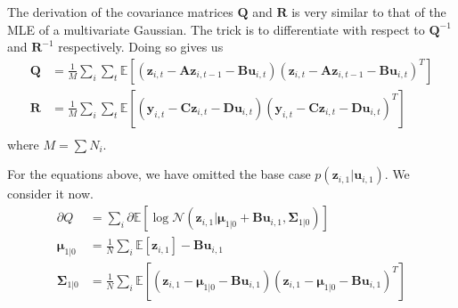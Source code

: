 \documentclass[a4paper,11pt]{article}
\begin{document}
The derivation of the covariance matrices $\mathbf{Q}$ and $\mathbf{R}$ is very similar to that of
the MLE of a multivariate Gaussian. The trick is to differentiate with respect to
$\mathbf{Q}^{-1}$ and $\mathbf{R}^{-1}$ respectively. Doing so gives us
\begin{align*}
  \mathbf{Q} &= \frac{1}{M}\sum\limits_i\sum\limits_t
  \mathbb{E}\left[
    \left(\mathbf{z}_{i,t} - \mathbf{Az}_{i,t-1}  - \mathbf{Bu}_{i,t}\right)
    \left(\mathbf{z}_{i,t} - \mathbf{Az}_{i,t-1}  - \mathbf{Bu}_{i,t}\right)^T
  \right] \\
  \mathbf{R} &= \frac{1}{M}\sum\limits_i\sum\limits_t
  \mathbb{E}\left[
    \left(\mathbf{y}_{i,t} - \mathbf{Cz}_{i,t}  - \mathbf{Du}_{i,t}\right)
    \left(\mathbf{y}_{i,t} - \mathbf{Cz}_{i,t}  - \mathbf{Du}_{i,t}\right)^T
  \right] \\
\end{align*}
where $M = \sum N_i$.

For the equations above, we have omitted the base case $p(\mathbf{z}_{i,1}|\mathbf{u}_{i,1})$. We
consider it now.
\begin{align*}
  \partial Q &=\sum\limits_i \partial \mathbb{E} \left[
  \log \mathcal{N}\left(
    \mathbf{z}_{i,1} | \boldsymbol{\mu}_{1|0} + \mathbf{Bu}_{i,1}, \boldsymbol{\Sigma}_{1|0}
  \right)
\right] \\
\boldsymbol{\mu}_{1|0} &= \frac{1}{N}\sum\limits_i \mathbb{E}\left[\mathbf{z}_{i,1}\right]
- \mathbf{Bu}_{i,1} \\
\boldsymbol{\Sigma}_{1|0} &= \frac{1}{N}\sum\limits_i \mathbb{E}\left[
  \left(\mathbf{z}_{i,1} - \boldsymbol{\mu}_{1|0} - \mathbf{Bu}_{i,1}\right)
  \left(\mathbf{z}_{i,1} - \boldsymbol{\mu}_{1|0} - \mathbf{Bu}_{i,1}\right)^T
\right]
\end{align*}
\end{document}
